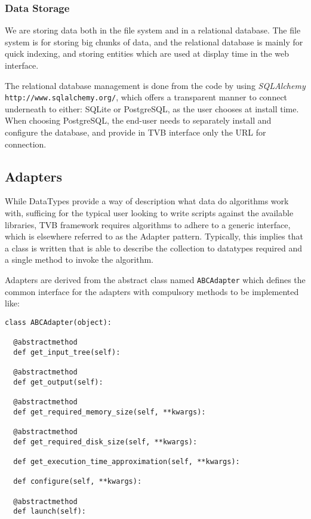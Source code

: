 
\subsubsection{Data Storage}

We are storing data both in the file system and in a relational database.
The file system is for storing big chunks of data, and the relational database is mainly for quick indexing, 
and storing entities which are used at display time in the web interface.

The relational database management is done from the code by using \emph{SQLAlchemy} \texttt{http://www.sqlalchemy.org/}, 
which offers a transparent manner to connect underneath to either: SQLite or PostgreSQL, as the user chooses at install time.
When choosing PostgreSQL, the end-user needs to separately install and configure the database, and provide in TVB
interface only the URL for connection.


\subsection{Adapters}

While DataTypes provide a way of description what data do algorithms work with, 
sufficing for the typical user looking to write scripts against the
available libraries, TVB framework requires algorithms to adhere to 
a generic interface, which is elsewhere referred to as the Adapter pattern.
Typically, this implies that a class is written that is able to describe
the collection to datatypes required and a single method to invoke the
algorithm.

Adapters are derived from the abstract class named \texttt{ABCAdapter} which
defines the common interface for the adapters with compulsory methods to be implemented like:

\begin{lstlisting}[caption={The ABCAdapter listing},
                   label={lst:ABCAdapter}]
class ABCAdapter(object):

  @abstractmethod
  def get_input_tree(self):

  @abstractmethod
  def get_output(self):

  @abstractmethod
  def get_required_memory_size(self, **kwargs):

  @abstractmethod
  def get_required_disk_size(self, **kwargs):

  def get_execution_time_approximation(self, **kwargs):

  def configure(self, **kwargs):

  @abstractmethod
  def launch(self):
\end{lstlisting}

